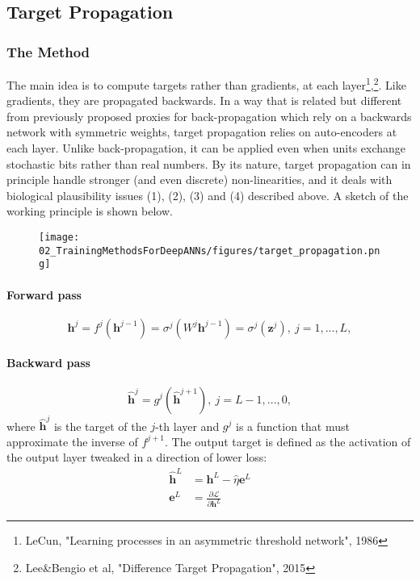 \documentclass[main]{subfiles}
\begin{document}
\subsection{Target Propagation}

\subsubsection{The Method}
The main idea is to compute targets rather than gradients, at each layer\footnote{LeCun, "Learning processes in an asymmetric threshold network", 1986},\footnote{Lee\&Bengio et al, "Difference Target Propagation", 2015}. Like gradients, they are propagated backwards. In a way that is related but different from previously proposed proxies for back-propagation which rely on a backwards network with symmetric weights, target propagation relies on auto-encoders at each layer. Unlike back-propagation, it can be applied even when units exchange stochastic bits rather than real numbers. By its nature, target propagation can in principle handle stronger (and even discrete) non-linearities, and it deals with biological plausibility issues (1), (2), (3) and (4) described above. A sketch of the working principle is shown below. 

\begin{figure}[H]
	\centering
	\texttt{[image: 02\_TrainingMethodsForDeepANNs/figures/target\_propagation.png]}
	\caption{}
	\label{fig:targetprop}
\end{figure}

\paragraph{Forward pass}
\begin{equation}
	\bm{h}^j = f^j(\bm{h}^{j-1}) = \sigma^j(W^j\bm{h}^{j-1}) = \sigma^j(\bm{z}^j),\ j=1, ..., L ,
\end{equation}

\paragraph{Backward pass}
\begin{equation}
	\bm{\hat{h}}^j = g^j(\bm{\hat{h}}^{j+1}),\ j=L-1, ..., 0 ,
\end{equation}
where $\bm{\hat{h}}^j$ is the target of the $j$-th layer and $g^j$ is a function that must approximate the inverse of $f^{j+1}$. The output target is defined as the activation of the output layer tweaked in a direction of lower loss:
\begin{align}
	\bm{\hat{h}}^L &= \bm{h}^L - \hat{\eta}\bm{e}^L\\
	\bm{e}^L &= \frac{\partial \mathcal{L}}{\partial \bm{h}^L}
\end{align}
\end{document}
